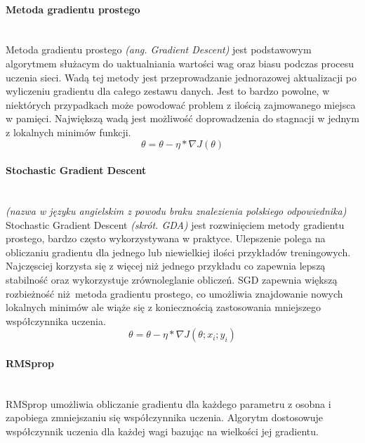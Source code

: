 \paragraph{Metoda gradientu prostego} \mbox{}\\
Metoda gradientu prostego \textit{(ang. Gradient Descent)} jest podstawowym algorytmem
służacym do uaktualniania wartości wag oraz biasu podczas procesu uczenia sieci. Wadą tej
metody jest przeprowadzanie jednorazowej aktualizacji po wyliczeniu gradientu dla
całego zestawu danych. Jest to bardzo powolne, w niektórych przypadkach może powodować
problem z ilością zajmowanego miejsca w pamięci. Największą wadą jest możliwość doprowadzenia
do stagnacji w jednym z lokalnych minimów funkcji.
\begin{equation}
\theta = \theta - \eta * \nabla J(\theta)
\end{equation}

\paragraph{Stochastic Gradient Descent} \mbox{}\\
\textit{(nazwa w języku angielskim z powodu braku znalezienia polskiego odpowiednika)}
Stochastic Gradient Descent \textit{(skrót. GDA)} jest rozwinięciem metody gradientu
prostego, bardzo często wykorzystywana w praktyce. Ulepszenie polega na obliczaniu
gradientu dla jednego lub niewielkiej ilości przykładów treningowych. Najczęsciej
korzysta się z więcej niż jednego przykładu co zapewnia lepszą stabilność oraz
wykorzystuje zrównoleglanie obliczeń. SGD zapewnia większą rozbieżność niż metoda
gradientu prostego, co umożliwia znajdowanie nowych lokalnych minimów ale wiąże się
z koniecznością zastosowania mniejszego współczynnika uczenia.
\begin{equation}
\theta = \theta - \eta * \nabla J(\theta; x_i; y_i)
\end{equation}

\paragraph{RMSprop} \mbox{}\\
RMSprop umożliwia obliczanie gradientu dla każdego parametru z osobna i zapobiega
zmniejszaniu się współczynnika uczenia. Algorytm dostosowuje współczynnik uczenia dla każdej wagi
bazując na wielkości jej gradientu.

